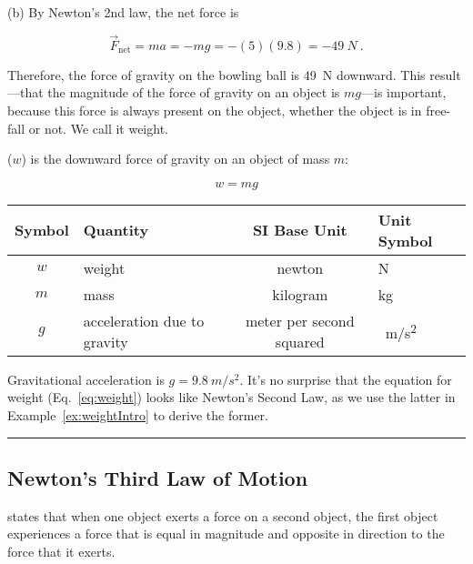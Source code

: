 \documentclass[]{article}
\begin{document}
(b) By Newton's 2nd law, the net force is

\begin{equation*}
    \vec{F}_{\text{net}} = m a = -m g = -(5)(9.8) = -\SI{49}{N}\ .
\end{equation*}

Therefore, the force of gravity on the bowling ball is \SI{49}{N} downward. This result---that the magnitude of the force of gravity on an object is $mg$---is important, because this force is always present on the object, whether the object is in free-fall or not. We call it weight.

 ($w$) is the downward force of gravity on an object of mass $m$:

\begin{equation} \label{eq:weight} 
    w = mg
\end{equation}

\begin{center}
    \begin{tabular}{cl|cl}
    \hline
    \textbf{Symbol} & \textbf{Quantity} & \textbf{SI Base Unit} & \textbf{Unit Symbol}  \\
    \hline\hline
    \rule{0pt}{2.5ex}
        $w$ & weight & newton & N\\
        $m$ & mass & kilogram & kg\\
        $g$ & acceleration due to gravity & meter per second squared & \SI{}{m/s^2}\\
    \hline
    \end{tabular}
\end{center}

Gravitational acceleration is $g = \SI{9.8}{m/s^2}$. It's no surprise that the equation for weight (Eq.~\ref{eq:weight}) looks like Newton's Second Law, as we use the latter in Example~\ref{ex:weightIntro} to derive the former. 

\vspace{1em}

\hrule

\subsection{Newton's Third Law of Motion} \label{N3R3iq}

 states that when one object exerts a force on a second object, the first object experiences a force that is equal in magnitude and opposite in direction to the force that it exerts.

\vspace{1em}
\end{document}
